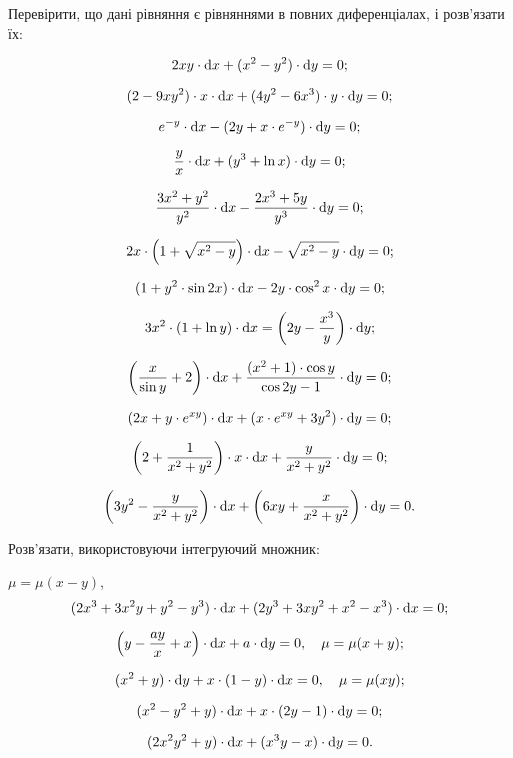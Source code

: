 Перевірити, що дані рівняння є рівняннями в повних диференціалах, і розв’язати їх:
\begin{problem}
	\[ 2 x y \cdot \mathop{}\!\mathrm{d} x + (x^2 - y^2) \cdot \mathop{}\!\mathrm{d} y = 0;\]
\end{problem}
\begin{problem}
	\[(2-9xy^2)\cdot x\cdot \mathop{}\!\mathrm{d} x + (4y^2-6x^3)\cdot y\cdot \mathop{}\!\mathrm{d} y=0;\]
\end{problem}
\begin{problem}
	\[e^{-y}\cdot\mathop{}\!\mathrm{d} x-(2y+x\cdot e^{-y})\cdot\mathop{}\!\mathrm{d} y=0;\]
\end{problem}
\begin{problem}
	\[ \frac yx\cdot\mathop{}\!\mathrm{d} x+(y^3+\ln x)\cdot\mathop{}\!\mathrm{d} y=0;\]
\end{problem}
\begin{problem}
	\[\frac{3x^2+y^2}{y^2}\cdot\mathop{}\!\mathrm{d} x-\frac{2x^3+5y}{y^3}\cdot\mathop{}\!\mathrm{d} y=0;\]
\end{problem}
\begin{problem}
	\[2x\cdot\left(1+\sqrt{x^2-y}\right)\cdot\mathop{}\!\mathrm{d} x-\sqrt{x^2-y}\cdot\mathop{}\!\mathrm{d} y=0;\]
\end{problem}
\begin{problem}
	\[(1+y^2\cdot\sin 2x)\cdot\mathop{}\!\mathrm{d} x-2y\cdot\cos^2x\cdot\mathop{}\!\mathrm{d} y=0;\]
\end{problem}
\begin{problem}
	\[3x^2\cdot(1+\ln y)\cdot\mathop{}\!\mathrm{d} x=\left(2y-\frac{x^3}y\right)\cdot\mathop{}\!\mathrm{d} y;\]
\end{problem}
\begin{problem}
	\[\left(\frac x{\sin y}+2\right)\cdot\mathop{}\!\mathrm{d} x+\frac{(x^2+1)\cdot\cos y}{\cos2y-1}\cdot\mathop{}\!\mathrm{d} y=0;\]
\end{problem}
\begin{problem}
	\[(2x+y\cdot e^{xy})\cdot\mathop{}\!\mathrm{d} x+(x\cdot e^{xy}+3y^2)\cdot\mathop{}\!\mathrm{d} y=0;\]
\end{problem}
\begin{problem}
	\[\left(2+\frac{1}{x^2+y^2}\right)\cdot x\cdot\mathop{}\!\mathrm{d} x+\frac{y}{x^2+y^2}\cdot \mathop{}\!\mathrm{d} y=0;\]
\end{problem}
\begin{problem}
	\[\left(3y^2-\frac{y}{x^2+y^2}\right)\cdot\mathop{}\!\mathrm{d} x+\left(6xy+\frac{x}{x^2+y^2}\right)\cdot \mathop{}\!\mathrm{d} y=0.\]
\end{problem}

Розв’язати, використовуючи інтегруючий множник:
\begin{problem} $\mu=\mu(x-y)$,
	\[(2x^3+3x^2y+y^2-y^3)\cdot\mathop{}\!\mathrm{d} x+(2y^3+3xy^2+x^2-x^3)\cdot\mathop{}\!\mathrm{d} x=0;\]
\end{problem}
\begin{problem}
	\[ \left(y-\frac{ay}{x}+x\right)\cdot\mathop{}\!\mathrm{d} x+a\cdot\mathop{}\!\mathrm{d} y=0, \quad \mu=\mu(x+y);\]
\end{problem}
\begin{problem}
	\[(x^2+y)\cdot\mathop{}\!\mathrm{d} y+x\cdot(1-y)\cdot\mathop{}\!\mathrm{d} x=0, \quad \mu=\mu(xy);\]
\end{problem}
\begin{problem}
	\[(x^2-y^2+y)\cdot\mathop{}\!\mathrm{d} x+x\cdot(2y-1)\cdot\mathop{}\!\mathrm{d} y=0;\]
\end{problem}
\begin{problem}
	\[(2x^2y^2+y)\cdot\mathop{}\!\mathrm{d} x+(x^3y-x)\cdot\mathop{}\!\mathrm{d} y=0.\]
\end{problem}